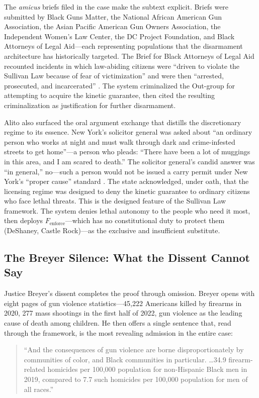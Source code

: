The \textit{amicus} briefs filed in the case make the subtext explicit. Briefs were submitted by Black Guns Matter, the National African American Gun Association, the Asian Pacific American Gun Owners Association, the Independent Women's Law Center, the DC Project Foundation, and Black Attorneys of Legal Aid---each representing populations that the disarmament architecture has historically targeted. The Brief for Black Attorneys of Legal Aid recounted incidents in which law-abiding citizens were ``driven to violate the Sullivan Law because of fear of victimization'' and were then ``arrested, prosecuted, and incarcerated'' \cite{bruen}. The system criminalized the Out-group for attempting to acquire the kinetic guarantee, then cited the resulting criminalization as justification for further disarmament.

Alito also surfaced the oral argument exchange that distills the discretionary regime to its essence. New York's solicitor general was asked about ``an ordinary person who works at night and must walk through dark and crime-infested streets to get home''---a person who pleads: ``There have been a lot of muggings in this area, and I am scared to death.'' The solicitor general's candid answer was ``in general,'' no---such a person would not be issued a carry permit under New York's ``proper cause'' standard \cite{bruen}. The state acknowledged, under oath, that the licensing regime was designed to deny the kinetic guarantee to ordinary citizens who face lethal threats. This is the designed feature of the Sullivan Law framework. The system denies lethal autonomy to the people who need it most, then deploys $F_{\text{enforce}}$---which has no constitutional duty to protect them (DeShaney, Castle Rock)---as the exclusive and insufficient substitute.

\subsection{The Breyer Silence: What the Dissent Cannot Say}

Justice Breyer's dissent completes the proof through omission. Breyer opens with eight pages of gun violence statistics---45,222 Americans killed by firearms in 2020, 277 mass shootings in the first half of 2022, gun violence as the leading cause of death among children. He then offers a single sentence that, read through the framework, is the most revealing admission in the entire case:

\begin{quote}
``And the consequences of gun violence are borne disproportionately by communities of color, and Black communities in particular. \ldots 34.9 firearm-related homicides per 100,000 population for non-Hispanic Black men in 2019, compared to 7.7 such homicides per 100,000 population for men of all races.'' \cite{bruen}
\end{quote}

